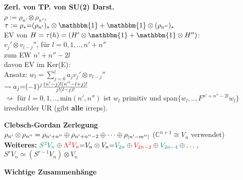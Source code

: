 \documentclass[8pt, a4paper, landscape]{extarticle}
\newcommand{\tit}[1]{\textbf{#1} \\}
\newcommand{\sh}[1]{\small\textbf{#1}}
\newcommand{\eq}{\negthickspace=\negthickspace}
\newcommand{\hi}[1]{\textcolor{Cerulean}{#1}}
\newcommand{\green}[1]{\textcolor{teal}{#1}}
\newcommand{\re}[1]{\textcolor{red}{#1}}
\begin{document}
\begin{multicols*}{5}
\begin{ibox}
\end{ibox}
\begin{ibox}
\small
    \tit{Zerl. von TP. von SU(2) Darst.}
    $\rho:=\rho_{n'}\otimes\rho_{n''}$, \\ $\tau:=\rho_*\eq(\rho_{n'})_*\otimes\mathbbm{1}+\mathbbm{1}\otimes(\rho_{n''})_*$\\
    \hi{EV von $H=\tau(h)=(H'\otimes\mathbbm{1}+\mathbbm{1}\otimes H'')$:}\\
    $v_j'\otimes v_{l-j}''$, für $l=0,1,..,n'+n''$\\ zum EW $n'+n''-2l$\\
    \hi{davon EV im Ker(E):}\\
    Ansatz: $w_l = \sum_{j=0}^la_jv_j'\otimes v_{l-j}''$ \\
    $\rightsquigarrow a_j\eq(-1)^j\frac{(n'-j)!(n''-l+j)!}{j!(l-j)!}$\\
    $\rightsquigarrow$ für $l=0,1,..,$min$(n',n'')$ ist $w_l$ primitiv und span$\{w_l,..,F^{n'+n''-2l}w_l\}$ irreduzibler UR (gibt \textbf{alle} irreps).
\end{ibox}
\begin{ibox}
    \tit{Clebsch-Gordan Zerlegung }
    $\rho_{n'}\otimes\rho_{n''}=\rho_{n'+n''}\oplus\rho_{n'+n''-2}\oplus\cdots\oplus\rho_{\abs{n'-m''}}$     ($\mathbb{C}^{n+1} \cong V_n$ verwendet) \\
    \textbf{Weiteres:} $\green{S^2V_n}\oplus\re{\Lambda^2V_n}\eq V_n\otimes V_n\eq \green{V_{2n}}\oplus\re{V_{2n-2}}\oplus \green{V_{2n-4}}\oplus\dots$, \\
    $S^rV_n\simeq (S^{r-1}V_n)\otimes V_n$
\end{ibox}
\begin{cbox}
    \sh{Wichtige Zusammenhänge}
\end{cbox}


\end{multicols*}
\end{document}
